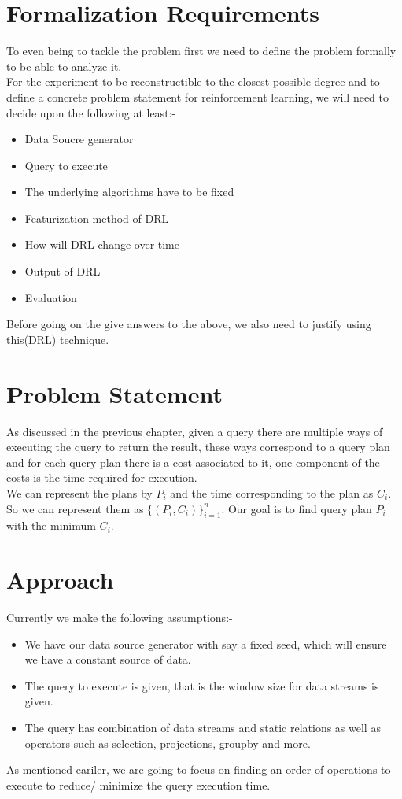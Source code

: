 \section{Formalization Requirements}
To even being to tackle the problem first we need to define the problem formally to be able to analyze it.\\
For the experiment to be reconstructible to the closest possible degree and to define a concrete problem statement for reinforcement learning, we will need to decide upon the following at least:-
\begin{itemize}
    \item Data Soucre generator
    \item Query to execute
    \item The underlying algorithms have to be fixed
    \item Featurization method of DRL
    \item How will DRL change over time
    \item Output of DRL
    \item Evaluation
\end{itemize}
Before going on the give answers to the above, we also need to justify using this(DRL) technique.

\section{Problem Statement}
As discussed in the previous chapter, given a query there are multiple ways of executing the query to return the result, these ways correspond to a query plan and for each query plan there is a cost associated to it, one component of the costs is the time required for execution.\\
We can represent the plans by $P_{i}$ and the time corresponding to the plan as $C_{i}$. So we can represent them as $\{(P_{i},C_{i})\}_{i=1}^{n}$. Our goal is to find query plan $P_{i}$ with the minimum $C_{i}$.

\section{Approach}
Currently we make the following assumptions:-
\begin{itemize}
    \item We have our data source generator with say a fixed seed, which will ensure we have a constant source of data.
    \item The query to execute is given, that is the window size for data streams is given.
    \item The query has combination of data streams and static relations as well as operators such as selection, projections, groupby and more.
\end{itemize}
As mentioned eariler, we are going to focus on finding an order of operations to execute to reduce/ minimize the query execution time.

